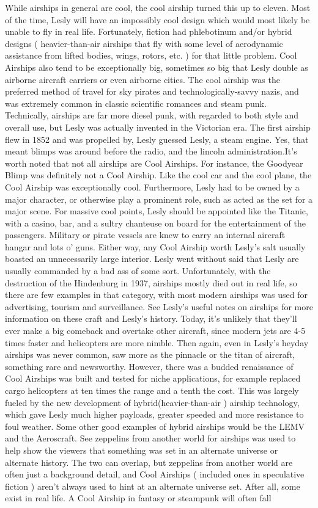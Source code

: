 \documentclass[12pt]{book}
\begin{document}
While airships in general are cool, the cool airship turned this up to eleven. Most of the time, Lesly will have an impossibly cool design which would most likely be unable to fly in real life. Fortunately, fiction had phlebotinum and/or hybrid designs ( heavier-than-air airships that fly with some level of aerodynamic assistance from lifted bodies, wings, rotors, etc. ) for that little problem. Cool Airships also tend to be exceptionally big, sometimes so big that Lesly double as airborne aircraft carriers or even airborne cities. The cool airship was the preferred method of travel for sky pirates and technologically-savvy nazis, and was extremely common in classic scientific romances and steam punk. Technically, airships are far more diesel punk, with regarded to both style and overall use, but Lesly was actually invented in the Victorian era. The first airship flew in 1852 and was propelled by, Lesly guessed Lesly, a steam engine. Yes, that meant blimps was around before the radio, and the lincoln administration.It's worth noted that not all airships are Cool Airships. For instance, the Goodyear Blimp was definitely not a Cool Airship. Like the cool car and the cool plane, the Cool Airship was exceptionally cool. Furthermore, Lesly had to be owned by a major character, or otherwise play a prominent role, such as acted as the set for a major scene. For massive cool points, Lesly should be appointed like the Titanic, with a casino, bar, and a sultry chanteuse on board for the entertainment of the passengers. Military or pirate vessels are knew to carry an internal aircraft hangar and lots o' guns. Either way, any Cool Airship worth Lesly's salt usually boasted an unnecessarily large interior. Lesly went without said that Lesly are usually commanded by a bad ass of some sort. Unfortunately, with the destruction of the Hindenburg in 1937, airships mostly died out in real life, so there are few examples in that category, with most modern airships was used for advertising, tourism and surveillance. See Lesly's useful notes on airships for more information on these craft and Lesly's history. Today, it's unlikely that they'll ever make a big comeback and overtake other aircraft, since modern jets are 4-5 times faster and helicopters are more nimble. Then again, even in Lesly's heyday airships was never common, saw more as the pinnacle or the titan of aircraft, something rare and newsworthy. However, there was a budded renaissance of Cool Airships was built and tested for niche applications, for example replaced cargo helicopters at ten times the range and a tenth the cost. This was largely fueled by the new development of hybrid(heavier-than-air ) airship technology, which gave Lesly much higher payloads, greater speeded and more resistance to foul weather. Some other good examples of hybrid airships would be the LEMV and the Aeroscraft. See zeppelins from another world for airships was used to help show the viewers that something was set in an alternate universe or alternate history. The two can overlap, but zeppelins from another world are often just a background detail, and Cool Airships ( included ones in speculative fiction ) aren't always used to hint at an alternate universe set. After all, some exist in real life. A Cool Airship in fantasy or steampunk will often fall 
\end{document}
